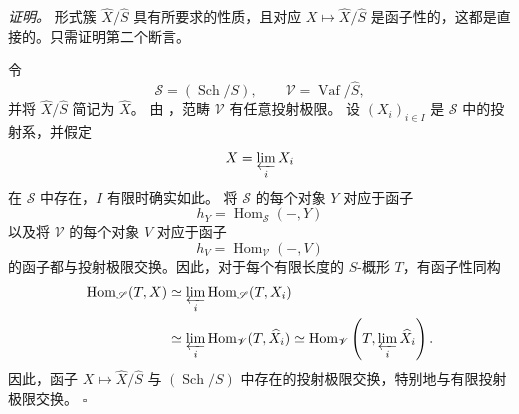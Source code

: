 \noindent\textit{证明。}
形式簇 \(\widehat X/\widehat S\) 具有所要求的性质，且对应
\(X\mapsto\widehat X/\widehat S\) 是函子性的，这都是直接的。只需证明第二个断言。

令
\[
  \mathscr S=(\operatorname{Sch}/S),
  \qquad
  \mathscr V=\operatorname{Vaf}/\widehat S,
\]
并将 \(\widehat X/\widehat S\) 简记为 \(\widehat X\)。
由 ，范畴 \(\mathscr V\) 有任意投射极限。
设 \((X_i)_{i\in I}\) 是 \(\mathscr S\) 中的投射系，并假定
\[
  X=\varprojlim_iX_i
\]
在 \(\mathscr S\) 中存在，\(I\) 有限时确实如此。
将 \(\mathscr S\) 的每个对象 \(Y\) 对应于函子
\[
  h_Y=\operatorname{Hom}_{\mathscr S}(-,Y)
\]
以及将 \(\mathscr V\) 的每个对象 \(V\) 对应于函子
\[
  h_V=\operatorname{Hom}_{\mathscr V}(-,V)
\]
的函子都与投射极限交换。因此，对于每个有限长度的 \(S\)-概形 \(T\)，有函子性同构
\[
\begin{aligned}
  \operatorname{Hom}_{\mathscr S}(T,X)
  &\simeq
  \varprojlim_i\operatorname{Hom}_{\mathscr S}(T,X_i)
\\
  &\simeq
  \varprojlim_i\operatorname{Hom}_{\mathscr V}(T,\widehat X_i)
  \simeq
  \operatorname{Hom}_{\mathscr V}
    \left(T,\varprojlim_i\widehat X_i\right).
\end{aligned}
\]
因此，函子 \(X\mapsto\widehat X/\widehat S\) 与
\((\operatorname{Sch}/S)\) 中存在的投射极限交换，特别地与有限投射极限交换。
\hfill\(\square\)

